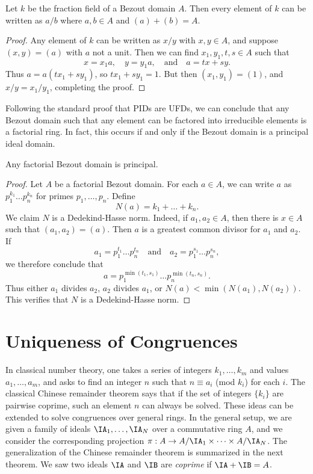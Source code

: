 \begin{lemma}
    Let $k$ be the fraction field of a Bezout domain $A$. Then every element of $k$ can be written as $a/b$ where $a,b \in A$ and $(a) + (b) = A$.
\end{lemma}
\begin{proof}
    Any element of $k$ can be written as $x/y$ with $x,y \in A$, and suppose $(x,y) = (a)$ with $a$ not a unit. Then we can find $x_1,y_1,t,s \in A$ such that
    \[ x = x_1a,\quad y = y_1a,\quad\text{and}\quad a = tx + sy. \]
    Thus $a = a(tx_1 + sy_1)$, so $tx_1 + sy_1 = 1$. But then $(x_1,y_1) = (1)$, and $x/y=x_1/y_1$, completing the proof.
\end{proof}

Following the standard proof that PIDs are UFDs, we can conclude that any Bezout domain such that any element can be factored into irreducible elements is a factorial ring. In fact, this occurs if and only if the Bezout domain is a principal ideal domain.

\begin{lemma}
    Any factorial Bezout domain is principal.
\end{lemma}
\begin{proof}
    Let $A$ be a factorial Bezout domain. For each $a \in A$, we can write $a$ as $p_1^{k_1} \dots p_n^{k_n}$ for primes $p_1, \dots, p_n$. Define
    \[ N(a) = k_1 + \dots + k_n. \]
    We claim $N$ is a Dedekind-Hasse norm. Indeed, if $a_1,a_2 \in A$, then there is $x \in A$ such that $(a_1,a_2) = (a)$. Then $a$ is a greatest common divisor for $a_1$ and $a_2$. If
    \[ a_1 = p_1^{t_1} \dots p_n^{t_n} \quad\text{and}\quad a_2 = p_1^{s_1} \dots p_n^{s_n}, \]
    we therefore conclude that
    \[ a = p_1^{\min(t_1,s_1)} \dots p_n^{\min(t_n,s_n)}. \]
    Thus either $a_1$ divides $a_2$, $a_2$ divides $a_1$, or $N(a) < \min(N(a_1),N(a_2))$. This verifies that $N$ is a Dedekind-Hasse norm.
\end{proof}

\section{Uniqueness of Congruences}

In classical number theory, one takes a series of integers $k_1, \dots, k_m$ and values $a_1, \dots, a_m$, and asks to find an integer $n$ such that $n \equiv a_i$ (mod $k_i$) for each $i$. The classical Chinese remainder theorem says that if the set of integers $\{ k_i \}$ are pairwise coprime, such an element $n$ can always be solved. These ideas can be extended to solve congruences over general rings. In the general setup, we are given a family of ideals $\IA_1, \dots, \IA_N$ over a commutative ring $A$, and we consider the corresponding projection $\pi: A \to A/\IA_1 \times \dots \times A/\IA_N$. The generalization of the Chinese remainder theorem is summarized in the next theorem. We saw two ideals $\IA$ and $\IB$ are \emph{coprime} if $\IA + \IB = A$.

